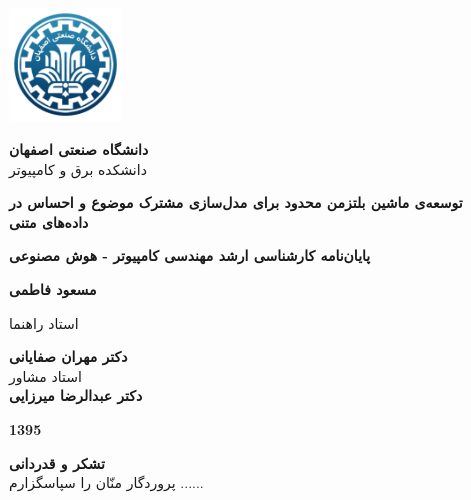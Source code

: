 \thispagestyle{empty}
\begin{center}
\includegraphics[height=3cm]{firstpage-img/IUTLogoFA}

{\large
	\textbf{دانشگاه صنعتی اصفهان}\\
	دانشکده  برق و کامپیوتر
}
\vspace{3.5cm}

{\LARGE
	\textbf{توسعه‌ی ماشین بلتزمن محدود برای مدل‌سازی مشترک موضوع و احساس در داده‌های متنی}\\
}
\vspace{3.5cm}

{\large
	\textbf{پایان‌نامه کارشناسی ارشد مهندسی کامپیوتر - هوش مصنوعی}\\
}
\vspace{1cm}

{\Large
	\textbf{مسعود فاطمی}\\
}
\vspace{2.5cm}

{\large
	استاد راهنما\\
}
\vspace{0.5cm}

{\Large
	\textbf{دکتر مهران صفایانی}\\
}
\vspace{1cm}
{\large
	استاد مشاور\\
}
\vspace{0.5cm}
{\Large
	\textbf{دکتر عبدالرضا میرزایی}\\
}
\vspace{2cm}

{\Large
	\textbf{1395}
}

\end{center}
\restoregeometry
\pagebreak

\thispagestyle{empty}
\vspace*{3cm}

{\large
	\textbf{تشکر و قدردانی}\\

	
پروردگار منّان را سپاسگزارم ......

}
\restoregeometry
\pagebreak

